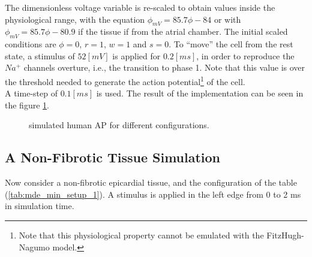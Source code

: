 The dimensionless voltage variable is re-scaled to obtain values inside the physiological range, with the equation $\phi_{mV} = 85.7 \phi - 84$ or with  $\phi_{mV} = 85.7 \phi - 80.9$ if the tissue if from the atrial chamber. The initial scaled conditions are $\phi = 0$, $r = 1$, $w = 1$ and $s = 0$. To ``move'' the cell from the rest state, a stimulus of $52 [mV]$ is applied for $0.2 [ms]$, in order to reproduce the $Na^+$ channels overture, i.e., the transition to phase 1. Note that this value is over the threshold needed to generate the action potential\footnote{Note that this physiological property cannot be emulated with the FitzHugh-Nagumo model.} of the cell. \\

A time-step of $0.1 [ms]$ is used. The result of the implementation can be seen in the figure \ref{fig:mde_min_ex1_single-cell}.

\begin{figure}[H]
\centering
{}
\caption{simulated human AP for different configurations.} \label{fig:mde_min_ex1_single-cell}
\end{figure}

\newpage 
\subsection{A Non-Fibrotic Tissue Simulation}

Now consider a non-fibrotic epicardial tissue, and the configuration of the table (\ref{tab:mde_min_setup_1}). A stimulus is applied in the left edge from 0 to 2 ms in simulation time.

